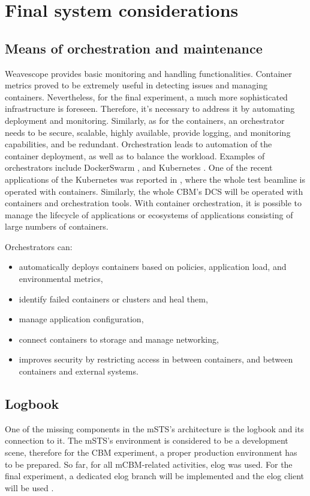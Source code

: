 \section{Final system considerations}
\subsection{Means of orchestration and maintenance} 
Weavescope provides basic monitoring and handling functionalities. Container metrics proved to be extremely useful in detecting issues and managing containers. Nevertheless, for the final experiment, a much more sophisticated infrastructure is foreseen. Therefore, it's necessary to address it by automating deployment and monitoring. Similarly, as for the containers, an orchestrator needs to be secure, scalable, highly available, provide logging, and monitoring capabilities, and be redundant. Orchestration leads to automation of the container deployment, as well as to balance the workload. 
Examples of orchestrators include DockerSwarm \cite{DockerSwarm}, and Kubernetes \cite{Kubernetes}. One of the recent applications of the Kubernetes was reported in \cite{ICALEPCS2021:Diamond}, where the whole test beamline is operated with containers. Similarly, the whole CBM's DCS will be operated with containers and orchestration tools. 
With container orchestration, it is possible to manage the lifecycle of applications or ecosystems of applications consisting of large numbers of containers. 

Orchestrators can:
 \begin{itemize}
     \item automatically deploys containers based on policies, application load, and environmental metrics,
     \item identify failed containers or clusters and heal them,
     \item manage application configuration,
     \item connect containers to storage and manage networking,
     \item improves security by restricting access in between containers, and between containers and external systems.
 \end{itemize}
\subsection{Logbook}
One of the missing components in the mSTS's architecture is the logbook and its connection to it. The mSTS's environment is considered to be a development scene, therefore for the CBM experiment, a proper production environment has to be prepared. So far, for all mCBM-related activities, elog \cite{elog} was used. For the final experiment, a dedicated elog branch will be implemented and the elog client will be used \cite{elog_client}.
